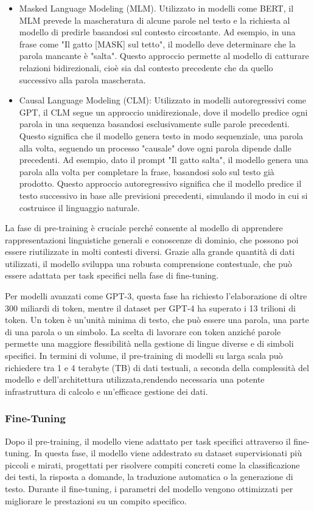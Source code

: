 \documentclass[target=mst,aauheader=,style=]{thud}
\begin{document}
\begin{itemize}
    \item Masked Language Modeling (MLM). Utilizzato in modelli come BERT, il MLM prevede la mascheratura di alcune parole nel testo e la richiesta al modello di predirle basandosi sul contesto circostante. Ad esempio, in una frase come "Il gatto [MASK] sul tetto", il modello deve determinare che la parola mancante è "salta". Questo approccio permette al modello di catturare relazioni bidirezionali, cioè sia dal contesto precedente che da quello successivo alla parola mascherata.
    \item Causal Language Modeling (CLM): Utilizzato in modelli autoregressivi come GPT, il CLM segue un approccio unidirezionale, dove il modello predice ogni parola in una sequenza basandosi esclusivamente sulle parole precedenti. Questo significa che il modello genera testo in modo sequenziale, una parola alla volta, seguendo un processo "causale" dove ogni parola dipende dalle precedenti. Ad esempio, dato il prompt "Il gatto salta", il modello genera una parola alla volta per completare la frase, basandosi solo sul testo già prodotto. Questo approccio autoregressivo significa che il modello predice il testo successivo in base alle previsioni precedenti, simulando il modo in cui si costruisce il linguaggio naturale.
\end{itemize}

La fase di pre-training è cruciale perché consente al modello di apprendere rappresentazioni linguistiche generali e conoscenze di dominio, che possono poi essere riutilizzate in molti contesti diversi. Grazie alla grande quantità di dati utilizzati, il modello sviluppa una robusta comprensione contestuale, che può essere adattata per task specifici nella fase di fine-tuning.

Per modelli avanzati come GPT-3, questa fase ha richiesto l'elaborazione di oltre 300 miliardi di token, mentre il dataset per GPT-4 ha superato i 13 trilioni di token. Un token è un'unità minima di testo, che può essere una parola, una parte di una parola o un simbolo. La scelta di lavorare con token anziché parole permette una maggiore flessibilità nella gestione di lingue diverse e di simboli specifici. In termini di volume, il pre-training di modelli su larga scala può richiedere tra 1 e 4 terabyte (TB) di dati testuali, a seconda della complessità del modello e dell'architettura utilizzata,rendendo necessaria una potente infrastruttura di calcolo e un'efficace gestione dei dati.

\subsubsection{Fine-Tuning}
Dopo il pre-training, il modello viene adattato per task specifici attraverso il fine-tuning. In questa fase, il modello viene addestrato su dataset supervisionati più piccoli e mirati, progettati per risolvere compiti concreti come la classificazione dei testi, la risposta a domande, la traduzione automatica o la generazione di testo. Durante il fine-tuning, i parametri del modello vengono ottimizzati per migliorare le prestazioni su un compito specifico.
\end{document}
